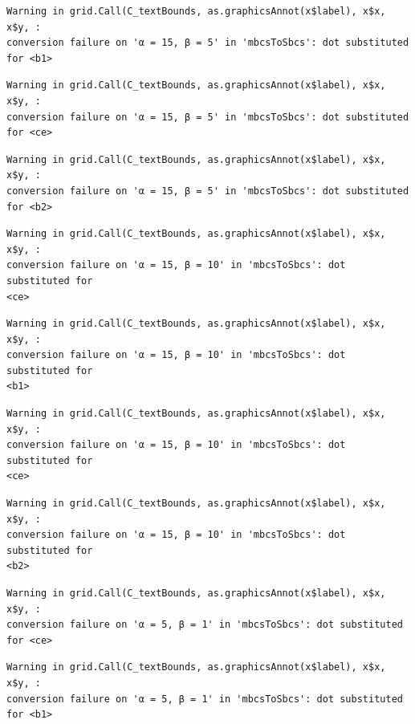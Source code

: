 \documentclass[
  spanish,
  a4paper,
]{scrreport}
\theoremstyle{plain}
\theoremstyle{definition}
\theoremstyle{definition}
\theoremstyle{remark}
\begin{document}
\begin{verbatim}
Warning in grid.Call(C_textBounds, as.graphicsAnnot(x$label), x$x, x$y, :
conversion failure on 'α = 15, β = 5' in 'mbcsToSbcs': dot substituted for <b1>
\end{verbatim}

\begin{verbatim}
Warning in grid.Call(C_textBounds, as.graphicsAnnot(x$label), x$x, x$y, :
conversion failure on 'α = 15, β = 5' in 'mbcsToSbcs': dot substituted for <ce>
\end{verbatim}

\begin{verbatim}
Warning in grid.Call(C_textBounds, as.graphicsAnnot(x$label), x$x, x$y, :
conversion failure on 'α = 15, β = 5' in 'mbcsToSbcs': dot substituted for <b2>
\end{verbatim}

\begin{verbatim}
Warning in grid.Call(C_textBounds, as.graphicsAnnot(x$label), x$x, x$y, :
conversion failure on 'α = 15, β = 10' in 'mbcsToSbcs': dot substituted for
<ce>
\end{verbatim}

\begin{verbatim}
Warning in grid.Call(C_textBounds, as.graphicsAnnot(x$label), x$x, x$y, :
conversion failure on 'α = 15, β = 10' in 'mbcsToSbcs': dot substituted for
<b1>
\end{verbatim}

\begin{verbatim}
Warning in grid.Call(C_textBounds, as.graphicsAnnot(x$label), x$x, x$y, :
conversion failure on 'α = 15, β = 10' in 'mbcsToSbcs': dot substituted for
<ce>
\end{verbatim}

\begin{verbatim}
Warning in grid.Call(C_textBounds, as.graphicsAnnot(x$label), x$x, x$y, :
conversion failure on 'α = 15, β = 10' in 'mbcsToSbcs': dot substituted for
<b2>
\end{verbatim}

\begin{verbatim}
Warning in grid.Call(C_textBounds, as.graphicsAnnot(x$label), x$x, x$y, :
conversion failure on 'α = 5, β = 1' in 'mbcsToSbcs': dot substituted for <ce>
\end{verbatim}

\begin{verbatim}
Warning in grid.Call(C_textBounds, as.graphicsAnnot(x$label), x$x, x$y, :
conversion failure on 'α = 5, β = 1' in 'mbcsToSbcs': dot substituted for <b1>
\end{verbatim}
\end{document}
